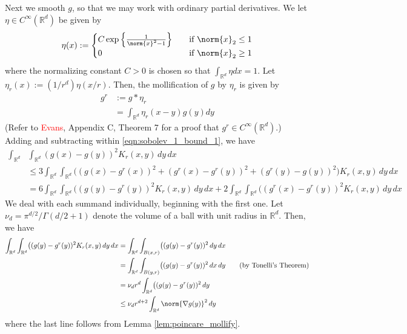 \documentclass{article}
\newcommand{\Reals}{\mathbb{R}}
\newcommand{\1}{\mathbf{1}}
\newcommand{\Rd}{\Reals^d}
\theoremstyle{alden}
\theoremstyle{aldenthm}
\theoremstyle{definition}
\theoremstyle{remark}
\begin{document}
Next we smooth $g$, so that we may work with ordinary partial derivatives.
We let $\eta \in C^{\infty}(\Rd)$ be given by
\begin{equation*}
\eta(x) :=
\begin{cases}
C \exp \left\{\frac{1}{\norm{x}^2 - 1}\right\}& \quad \textrm{if $\norm{x}_2 \leq 1$} \\
0 & \quad \textrm{if $\norm{x}_2 \geq 1$}
\end{cases}
\end{equation*}
where the normalizing constant $C > 0$ is chosen so that $\int_{\Rd} \eta dx = 1$. Let $\eta_r(x) := (1/r^d) \eta(x/r)$. Then, the mollification of $g$ by $\eta_r$ is given by
\begin{align*}
g^r & := g \ast \eta_r \\
& = \int_{\Rd} \eta_r(x - y) g(y) dy
\end{align*}
(Refer to \textcolor{red}{Evans}, Appendix C, Theorem 7 for a proof that $g^r \in C^{\infty}(\Rd)$.)
Adding and subtracting within \eqref{eqn:sobolev_1_bound_1}, we have
\begin{align}
\int_{\Rd} & \int_{\Rd} (g(x) - g(y))^2K_r(x,y) \,dy \,dx \\
& \leq 3 \int_{\Rd} \int_{\Rd} \bigl((g(x) - g^r(x))^2 + (g^r(x) - g^r(y))^2 + (g^r(y) - g(y))^2\bigr)K_r(x,y) \,dy \,dx \nonumber \\
& = 6 \int_{\Rd} \int_{\Rd} \bigl((g(y) - g^r(y))^2 K_r(x,y) \,dy \,dx + 2 \int_{\Rd} \int_{\Rd} \bigl((g^r(x) - g^r(y))^2 K_r(x,y) \,dy \,dx \label{eqn:sobolev_1_bound_5}
\end{align}
We deal with each summand individually, beginning with the first one. Let $\nu_d = \pi^{d/2}/\Gamma(d/2 + 1)$ denote the volume of a ball with unit radius in $\Rd$. Then, we have
\begin{align}
\int_{\Rd} \int_{\Rd} \bigl((g(y) - g^r(y))^2 K_r(x,y) \,dy \,dx & = \int_{\Rd} \int_{B(x,r)} \bigl((g(y) - g^r(y))^2\,dy \,dx \nonumber \\
& = \int_{\Rd} \int_{B(y,r)} \bigl((g(y) - g^r(y))^2\,dx \,dy \tag{by Tonelli's Theorem} \nonumber \\
& = \nu_d r^d \int_{\Rd}\bigl((g(y) - g^r(y))^2 \,dy \\
& \leq \nu_d r^{d + 2} \int_{\Rd} \norm{\nabla g(y)}^2 \,dy \label{eqn:sobolev_1_bound_4}
\end{align}
where the last line follows from Lemma \ref{lem:poincare_mollify}.
\end{document}
